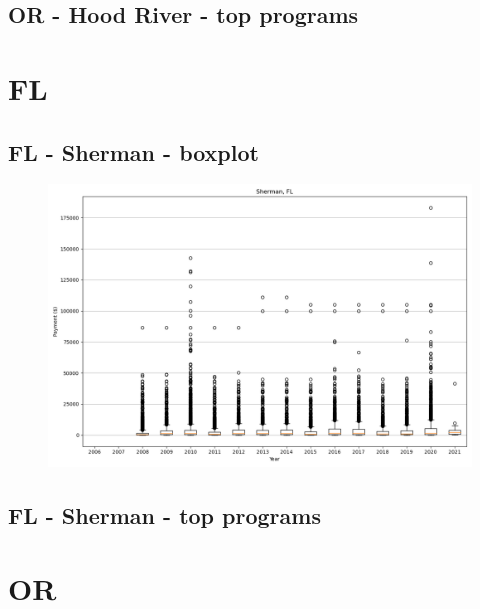 \subsection*{OR - Hood River - top programs}

\newpage
\section*{FL}
\subsection*{FL - Sherman - boxplot}
\begin{figure}[h]
\centering
\includegraphics[width=7in]{../output/boxplots/counties/Sherman-FL_boxplot.png}
\end{figure}


\subsection*{FL - Sherman - top programs}

\newpage
\section*{OR}
